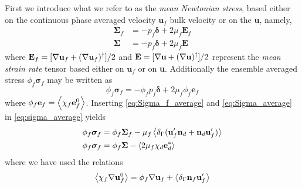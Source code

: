 First we introduce what we refer to as the \textit{mean Newtonian stress}, based either on the continuous phase averaged velocity $\textbf{u}_f$ bulk velocity or on the \textbf{u}, namely,
\begin{align}
    \bm\Sigma_f 
    &
    = -p_f \bm\delta + 2\mu_f \textbf{E}_f    
    \label{eq:Sigma_f_average}
    \\
    \bm\Sigma &
    = -p_f\bm\delta + 2 \mu_f \textbf{E}
    \label{eq:Sigma_average}
\end{align}
where $\textbf{E}_f = [\mathbf{\nabla} \textbf{u}_f + (\mathbf{\nabla} \textbf{u}_f)^{\dagger}]/2$ and $\textbf{E} =[\mathbf{\nabla} \textbf{u} + (\mathbf{\nabla} \textbf{u})^{\dagger}]/2$ represent the \textit{mean strain rate} tensor based either on $\textbf{u}_f$ or on \textbf{u}. 
Additionally the ensemble averaged stress $\phi_f \bm\sigma_f$ may be written as 
\begin{equation}
    \phi_f \bm\sigma_f = - \phi _f p_f \bm\delta + 2 \mu_ f \phi_f \textbf{e}_f
    \label{eq:sigma_average}
\end{equation}
where $\phi _f \textbf{e}_f = \left<\chi _f \textbf{e}_f^0\right>$. 
Inserting \ref{eq:Sigma_f_average} and \ref{eq:Sigma_average} in  \ref{eq:sigma_average} yields
\begin{align}
    \phi_f \bm\sigma_f 
    &=
    \phi_f \bm\Sigma_f
    - \mu_f \avg{\delta_\Gamma( \textbf{u}_f'  \textbf{n}_d +  \textbf{n}_d \textbf{u}_f' )}
    \label{eq:stress_closure}\\
    \phi_f \bm\sigma_f 
    &=
    \phi_f \bm\Sigma
    - \avg{2\mu_f \chi_d \textbf{e}_d^*}
    \label{eq:stress_closure1}
\end{align}
where we have used the relations 
\begin{equation}
    \avg{\chi_f \grad \textbf{u}_f^0}
    = 
    \phi_f \grad  \textbf{u}_f
    + \avg{\delta_\Gamma \textbf{n}_f \textbf{u}_f'}
    \label{eq:first_rel}
\end{equation}

